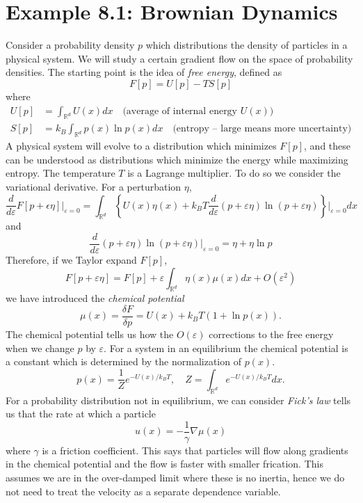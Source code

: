 \documentclass[11pt]{article}
\begin{document}
\section*{Example 8.1: Brownian Dynamics }
Consider a probability density $p$ which distributions the density of particles in a physical system. We will study a certain gradient flow on the space of probability densities. The starting point is the idea of \emph{free energy}, defined as 
\begin{equation}
F[p] = U[p] - T S[p]
\end{equation}
where
\begin{align}
U[p]  &= \int_{{\mathbb R}^d} U(x)dx\quad \text{(average of internal energy $U(x)$)}\\
S[p] &= k_B\int_{{\mathbb R}^d}p(x)\ln p(x)dx \quad \text{(entropy -- large means more uncertainty)}
\end{align}
A physical system will evolve to a distribution which minimizes $F[p]$, and these can be understood as distributions which minimize the energy while maximizing entropy. The temperature $T$ is a Lagrange multiplier. 
To do so we consider the variational derivative. For a perturbation $\eta$, 
\begin{equation}
\frac{d}{d\varepsilon}F[p + \epsilon \eta]\Big|_{\varepsilon =0} = \int_{{\mathbb R}^d} \left\{ U(x)\eta(x) + k_B T\frac{d}{d\varepsilon}(p + \varepsilon \eta)\ln (p + \varepsilon \eta) \right\} \Big|_{\varepsilon =0} dx
\end{equation}
and 
\begin{equation}
\frac{d}{d\varepsilon}(p + \varepsilon \eta)\ln (p + \varepsilon \eta) \Big|_{\varepsilon =0} = \eta + \eta \ln p
\end{equation}
Therefore, if we Taylor expand $F[p]$, 
\begin{equation}
F[p + \varepsilon \eta] = F[p] + \varepsilon \int_{{\mathbb R}^d} \eta(x) \mu(x)dx + O(\varepsilon^2)
\end{equation}
we have introduced the \emph{chemical potential}
\begin{equation}
\mu(x) = \frac{\delta F}{\delta p} = U(x) + k_B T(1 + \ln p(x)).
\end{equation}
The chemical potential tells us how the $O(\varepsilon)$ corrections to the free energy when we change $p$ by $\varepsilon$. For a system in an equilibrium the chemical potential is a constant which is determined by the normalization of $p(x)$. 
\begin{equation}
p(x) = \frac{1}{Z} e^{-U(x)/k_BT},\quad Z = \int_{\mathbb R^d}e^{-U(x)/k_BT}dx.
\end{equation}
For a probability distribution not in equilibrium, we can consider \emph{Fick's law} tells us that the rate at which a particle 
\begin{equation}
u(x) = - \frac{1}{\gamma} \nabla \mu(x)
\end{equation}
where $\gamma$ is a friction coefficient. 
This says that particles will flow along gradients in the chemical potential and the flow is faster with smaller frication. This assumes we are in the over-damped limit where these is no inertia, hence we do not need to treat the velocity as a separate dependence variable.   
\end{document}
